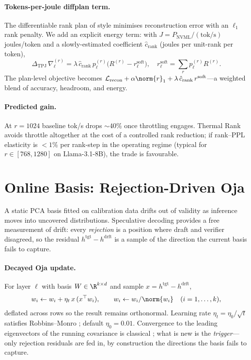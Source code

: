 \documentclass[11pt]{article}
\begin{document}
\paragraph{Tokens-per-joule diffplan term.}  The differentiable rank plan
of \cite{robbins1951sa} style minimises reconstruction error with an
$\ell_1$ rank penalty.  We add an explicit energy term: with
$J=P_\text{NVML}/(\text{tok/s})$ joules/token and a slowly-estimated
coefficient $\hat c_\text{rank}$ (joules per unit-rank per token),
\[
\Delta_\text{TPJ}\,\nabla_\ell^{(r)}=
\lambda\,\hat c_\text{rank}\,p_\ell^{(r)}\bigl(R^{(r)}-r^\text{soft}_\ell\bigr),
\quad r^\text{soft}_\ell=\sum_r p_\ell^{(r)}R^{(r)}.
\]
The plan-level objective becomes $\mathcal L_\text{recon}+\alpha\norm{r}_1
+\lambda\,\hat c_\text{rank}\,r^\text{soft}$---a weighted blend of accuracy,
headroom, and energy.

\paragraph{Predicted gain.}  At $r{=}1024$ baseline tok/s drops $\sim 40\%$
once throttling engages.  Thermal Rank avoids throttle altogether at the
cost of a controlled rank reduction; if rank--PPL elasticity is $<1\%$ per
rank-step in the operating regime (typical for $r\in[768,1280]$ on
Llama-3.1-8B), the trade is favourable.

\section{Online Basis: Rejection-Driven Oja}
\label{sec:online}
A static PCA basis fitted on calibration data drifts out of validity as
inference moves into uncovered distributions.  Speculative decoding
\cite{leviathan2023speculative,chen2023speculative} provides a free
measurement of drift: every \emph{rejection} is a position where draft and
verifier disagreed, so the residual $h^\text{tgt}-h^\text{drft}$ is a
sample of the direction the current basis fails to capture.

\paragraph{Decayed Oja update.}  For layer $\ell$ with basis
$W\in\R^{k\times d}$ and sample $x=h^\text{tgt}-h^\text{drft}$,
\[
w_i\leftarrow w_i+\eta_t\,x\,(x^\top w_i),\qquad w_i\leftarrow w_i/\norm{w_i}
\quad(i=1,\dots,k),
\]
deflated across rows so the result remains orthonormal.  Learning rate
$\eta_t=\eta_0/\sqrt t$ satisfies Robbins--Monro \cite{robbins1951sa};
default $\eta_0=0.01$.  Convergence to the leading eigenvectors of the
running covariance is classical \cite{oja1982}; what is new is the
\emph{trigger}---only rejection residuals are fed in, by construction the
directions the basis fails to capture.
\end{document}

